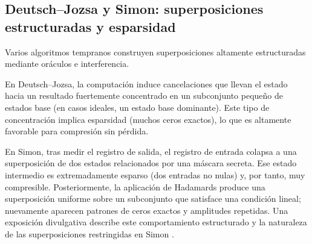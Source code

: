 \subsection{Deutsch--Jozsa y Simon: superposiciones estructuradas y esparsidad}
\label{subsec:patrones_dj_simon}

Varios algoritmos tempranos construyen superposiciones altamente estructuradas mediante oráculos e interferencia.

En Deutsch--Jozsa, la computación induce cancelaciones que llevan el estado hacia un resultado fuertemente concentrado en un subconjunto pequeño de estados base (en casos ideales, un estado base dominante). Este tipo de concentración implica esparsidad (muchos ceros exactos), lo que es altamente favorable para compresión sin pérdida.

En Simon, tras medir el registro de salida, el registro de entrada colapsa a una superposición de dos estados relacionados por una máscara secreta. Ese estado intermedio es extremadamente esparso (dos entradas no nulas) y, por tanto, muy compresible. Posteriormente, la aplicación de Hadamards produce una superposición uniforme sobre un subconjunto que satisface una condición lineal; nuevamente aparecen patrones de ceros exactos y amplitudes repetidas. Una exposición divulgativa describe este comportamiento estructurado y la naturaleza de las superposiciones restringidas en Simon \cite{gupta2025_simon}.
